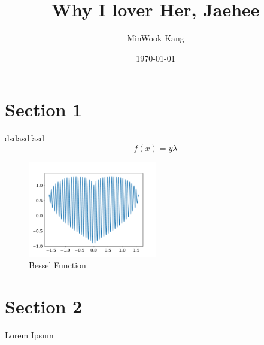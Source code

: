 \documentclass[11pt]{article}
\title{Why I lover Her, Jaehee}
\author{MinWook Kang}
\date{\today}
\begin{document}
\maketitle
\pagebreak



\section{Section 1}
\noindent
dsdasdfasd
\begin{equation}
    f(x) = y \lambda
\end{equation}

\begin{figure}[!ht]
  \centering
  \includegraphics[width=0.5\textwidth]{13.pdf}
  \caption{Bessel Function}
\end{figure}

\pagebreak
\section{Section 2}
Lorem Ipsum \\

\end{document}
